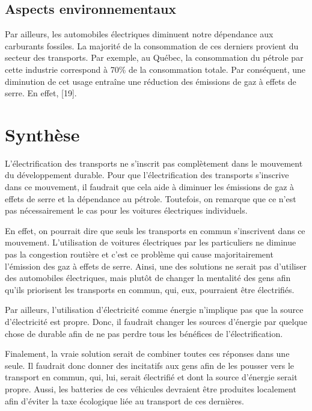 \subsection{Aspects environnementaux}

Par ailleurs, les automobiles électriques diminuent notre dépendance aux carburants fossiles. La majorité de la consommation de ces derniers provient du secteur des transports. Par exemple, au Québec, la consommation du pétrole par cette industrie correspond à 70\% de la consommation totale. Par conséquent, une diminution de cet usage entraîne une réduction des émissions de gaz à effets de serre. En effet, [19].

\section{Synthèse}

L'électrification des transports ne s'inscrit pas complètement dans le mouvement du développement durable. Pour que l'électrification des transports s'inscrive dans ce mouvement, il faudrait que cela aide à diminuer les émissions de gaz à effets de serre et la dépendance au pétrole. Toutefois, on remarque que ce n'est pas nécessairement le cas pour les voitures électriques individuels.

En effet, on pourrait dire que seuls les transports en commun s'inscrivent dans ce mouvement. L'utilisation de voitures électriques par les particuliers ne diminue pas la congestion routière et c'est ce problème qui cause majoritairement l'émission des gaz à effets de serre. Ainsi, une des solutions ne serait pas d'utiliser des automobiles électriques, mais plutôt de changer la mentalité des gens afin qu'ils priorisent les transports en commun, qui, eux, pourraient être électrifiés. 

Par ailleurs, l'utilisation d'électricité comme énergie n'implique pas que la source d'électricité est propre. Donc, il faudrait changer les sources d'énergie par quelque chose de durable afin de ne pas perdre tous les bénéfices de l'électrification. 

Finalement, la vraie solution serait de combiner toutes ces réponses dans une seule. Il faudrait donc donner des incitatifs aux gens afin de les pousser vers le transport en commun, qui, lui, serait électrifié et dont la source d'énergie serait propre. Aussi, les batteries de ces véhicules devraient être produites localement afin d'éviter la taxe écologique liée au transport de ces dernières.
